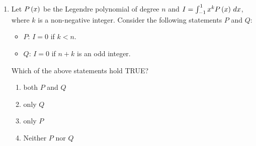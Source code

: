 \documentclass[journal,12pt,twocolumn]{IEEEtran}
\theoremstyle{remark}
\begin{document}
\begin{enumerate}[start=1]
    \item Let $P\left(x\right)$ be the Legendre polynomial of degree $n$ and $I = \int_{-1}^{1} x^k P\left(x\right) \, dx$, where $k$ is a non-negative integer. Consider the following statements $P$ and $Q$:
    \begin{itemize}
        \item $P$: $I = 0$ if $k < n$.
        \item $Q$: $I = 0$ if $n + k$ is an odd integer.
    \end{itemize}
    Which of the above statements hold TRUE?
    \begin{enumerate}
       
        \item both $P$ and $Q$
        \item only $Q$
        \item only $P$
        \item Neither $P$ nor $Q$
    \end{enumerate}

 
 
\end{enumerate}
\end{document}
